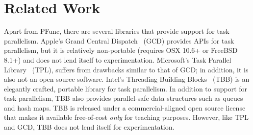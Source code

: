 \documentclass[9pt,twocolumn,letter]{article}
\begin{document}
\section{Related Work}
Apart from PFunc, there are several libraries that provide support for task 
parallelism.
%
Apple's Grand Central Dispatch~\cite{kn:gcd} (GCD) provides APIs for task
parallelism, but it is relatively non-portable (requires OSX 10.6+ or FreeBSD
8.1+) and does not lend itself to experimentation.
%
Microsoft's Task Parallel Library~\cite{kn:tpl} (TPL), suffers from drawbacks
similar to that of GCD; in addition, it is also not an open-source software.
%
Intel's Threading Building Blocks~\cite{kn:tbb} (TBB) is an elegantly crafted,
portable library for task parallelism.
%
In addition to support for task parallelism, TBB also provides parallel-safe 
data structures such as queues and hash maps.
%
TBB is released under a commercial-aligned open source license that makes it
available free-of-cost \textit{only} for teaching purposes.
%
However, like TPL and GCD, TBB does not lend itself for experimentation.

\footnotesize


\end{document}
